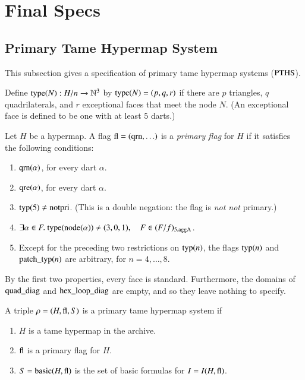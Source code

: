 \section{Final Specs}


\subsection{Primary Tame Hypermap System}
\label{sec:PTHS}

This subsection gives a specification of primary tame hypermap
systems (${\operatorname{PTHS}}$).

Define ${\operatorname{type}}(N):H/n\to\mathbb{N}^3$ by ${\operatorname{type}}(N) = (p,q,r)$
if there are $p$ triangles, $q$ quadrilaterals, and $r$
exceptional faces that meet the node $N$.  (An exceptional face is
defined to be one with at least $5$ darts.)


\begin{definition}
Let $H$ be a hypermap.  A flag ${\operatorname{fl}} = ({\operatorname{qrn}},\ldots)$ is a
{\it primary flag} for $H$ if it satisfies the following
conditions:
    \begin{enumerate}
        \item ${\operatorname{qrn}}(\alpha)$, for every dart $\alpha$.
        \item ${\operatorname{qre}}(\alpha)$, for every dart $\alpha$.
        \item ${\operatorname{typ}}(5)\ne{\operatorname{notpri}}$.  (This is a double negation: the flag is
        {\it not not\/} primary.)
        \item $\exists\alpha\in F.\ \op{type}(\op{node}(\alpha)) \ne
    (3,0,1),\quad F\in (F/f)_{5,\op{aggA}}$.
        \item Except for the preceding two restrictions on ${\operatorname{typ}}(n)$, the flags
        ${\operatorname{typ}}(n)$ and ${\operatorname{patch\_typ}}(n)$ are arbitrary, for $n=4,\ldots,8$.
    \end{enumerate}
\end{definition}

\begin{remark} By the first two properties, every face is
standard.  Furthermore, the domains of ${\operatorname{quad\_diag}}$ and
${\operatorname{hex\_loop\_diag}}$ are empty, and so they leave nothing to
specify.
\end{remark}

\begin{definition}
A triple $\rho=(H,{\operatorname{fl}},S)$ is a primary tame hypermap system if
    \begin{enumerate}
    \item $H$ is a tame hypermap in the archive.
    \item ${\operatorname{fl}}$ is a primary flag for $H$.
    \item $S={\operatorname{basic}}(H,{\operatorname{fl}})$ is the set of basic formulas for $I=I(H,{\operatorname{fl}})$.
    \end{enumerate}
\end{definition}


